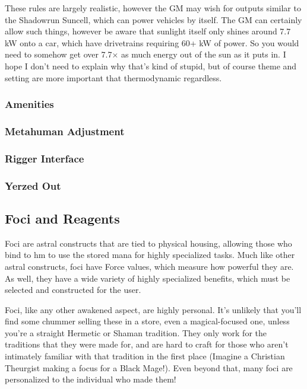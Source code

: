 \begin{multicols*}{2}
	These rules are largely realistic, however the GM may wish for outputs similar to the Shadowrun Suncell, which can power vehicles by itself. The GM can certainly allow such things, however be aware that sunlight itself only shines around 7.7 kW onto a car, which have drivetrains requiring 60+ kW of power. So you would need to somehow get over 7.7$\times$ as much energy out of the sun as it puts in. I hope I don't need to explain why that's kind of stupid, but of course theme and setting are more important that thermodynamic regardless.
	
	
	\subsubsection{Amenities}
	
	\subsubsection{Metahuman Adjustment}
	
	\subsubsection{Rigger Interface}
	
	\subsubsection{Yerzed Out}
	
	\subsection{Foci and Reagents}
	
	Foci are astral constructs that are tied to physical housing, allowing those who bind to hm to use the stored mana for highly specialized tasks. Much like other astral constructs, foci have Force values, which measure how powerful they are. As well, they have a wide variety of highly specialized benefits, which must be selected and constructed for the user.
	
	Foci, like any other awakened aspect, are highly personal. It's unlikely that you'll find some chummer selling these in a store, even a magical-focused one, unless you're a straight Hermetic or Shaman tradition. They only work for the traditions that they were made for, and are hard to craft for those who aren't intimately familiar with that tradition in the first place (Imagine a Christian Theurgist making a focus for a Black Mage!). Even beyond that, many foci are personalized to the individual who made them!
	

\end{multicols*}
